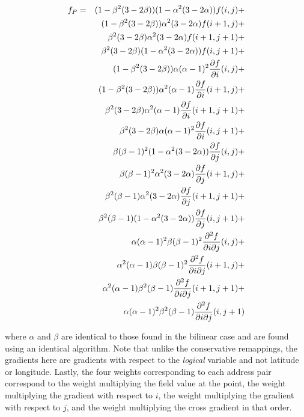\begin{description}
\begin{eqnarray}\label{eq:bicubic}
f_P & = & 
    (1 - \beta^2(3-2\beta))(1 - \alpha^2(3-2\alpha))f(i  ,j  ) + \nonumber \\
& & (1 - \beta^2(3-2\beta))     \alpha^2(3-2\alpha) f(i+1,j  ) + \nonumber \\
& &      \beta^2(3-2\beta)      \alpha^2(3-2\alpha) f(i+1,j+1) + \nonumber \\
& &      \beta^2(3-2\beta) (1 - \alpha^2(3-2\alpha))f(i  ,j+1) + \nonumber \\
& & (1 - \beta^2(3-2\beta))\alpha  (\alpha-1)^2 
                        {{\partial f}\over{\partial i}}(i  ,j  ) + \nonumber \\
& & (1 - \beta^2(3-2\beta))\alpha^2(\alpha-1) 
                        {{\partial f}\over{\partial i}}(i+1,j  ) + \nonumber \\
& &      \beta^2(3-2\beta) \alpha^2(\alpha-1)
                        {{\partial f}\over{\partial i}}(i+1,j+1) + \nonumber \\
& &      \beta^2(3-2\beta) \alpha  (\alpha-1)^2 
                        {{\partial f}\over{\partial i}}(i  ,j+1) + \nonumber \\
& & \beta  (\beta-1)^2(1 - \alpha^2(3-2\alpha))
                        {{\partial f}\over{\partial j}}(i  ,j  ) + \nonumber \\
& & \beta  (\beta-1)^2     \alpha^2(3-2\alpha) 
                        {{\partial f}\over{\partial j}}(i+1,j  ) + \nonumber \\
& & \beta^2(\beta-1)       \alpha^2(3-2\alpha)
                        {{\partial f}\over{\partial j}}(i+1,j+1) + \nonumber \\
& & \beta^2(\beta-1)  (1 - \alpha^2(3-2\alpha)) 
                        {{\partial f}\over{\partial j}}(i  ,j+1) + \nonumber \\
& & \alpha  (\alpha-1)^2\beta  (\beta-1)^2
           {{\partial^2 f}\over{\partial i \partial j}}(i  ,j  ) + \nonumber \\
& & \alpha^2(\alpha-1)  \beta  (\beta-1)^2 
           {{\partial^2 f}\over{\partial i \partial j}}(i+1,j  ) + \nonumber \\
& & \alpha^2(\alpha-1)  \beta^2(\beta-1)
           {{\partial^2 f}\over{\partial i \partial j}}(i+1,j+1) + \nonumber \\
& & \alpha  (\alpha-1)^2\beta^2(\beta-1)
           {{\partial^2 f}\over{\partial i \partial j}}(i  ,j+1)
\end{eqnarray}

     where $\alpha$ and $\beta$ are identical to those found in the bilinear
     case and are found using an identical algorithm.  Note that unlike the
     conservative remappings, the gradients here are gradients with respect to
     the {\em logical} variable and not latitude or longitude.  Lastly, the four
     weights corresponding to each address pair correspond to the weight
     multiplying the field value at the point, the weight multiplying the
     gradient with respect to $i$, the weight multiplying the gradient with
     respect to $j$, and the weight multiplying the cross gradient in that order.


\end{description}
